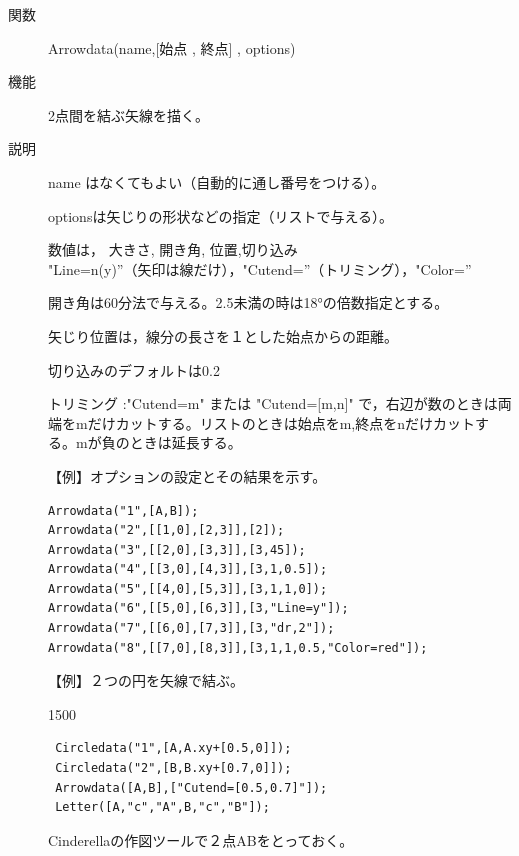 \documentclass[papersize,a4paper,10pt,uplatex]{jsarticle}
\begin{document}
\begin{description}
\vspace{10mm}

\hypertarget{arrowdata}{}
\item[関数]Arrowdata(name,[始点 , 終点] , options) 
\item[機能]2点間を結ぶ矢線を描く。
\item[説明]name はなくてもよい（自動的に通し番号をつける）。

optionsは矢じりの形状などの指定（リストで与える）。

\hspace*{10mm} 数値は， 大きさ, 開き角, 位置,切り込み\\
\hspace*{10mm} "Line=n(y)''（矢印は線だけ），"Cutend=''（トリミング），"Color=''

開き角は60分法で与える。2.5未満の時は18°の倍数指定とする。

矢じり位置は，線分の長さを１とした始点からの距離。

切り込みのデフォルトは0.2
 
トリミング :"Cutend=m" または "Cutend=[m,n]" で，右辺が数のときは両端をmだけカットする。リストのときは始点をm,終点をnだけカットする。mが負のときは延長する。

\vspace{\baselineskip}
【例】オプションの設定とその結果を示す。

\begin{verbatim}
Arrowdata("1",[A,B]);
Arrowdata("2",[[1,0],[2,3]],[2]);
Arrowdata("3",[[2,0],[3,3]],[3,45]);
Arrowdata("4",[[3,0],[4,3]],[3,1,0.5]);
Arrowdata("5",[[4,0],[5,3]],[3,1,1,0]);
Arrowdata("6",[[5,0],[6,3]],[3,"Line=y"]);
Arrowdata("7",[[6,0],[7,3]],[3,"dr,2"]);
Arrowdata("8",[[7,0],[8,3]],[3,1,1,0.5,"Color=red"]);
\end{verbatim}

\vspace{6mm}

\hspace{20mm}\scalebox{0.9}{}

【例】２つの円を矢線で結ぶ。

\begin{layer}{150}{0}
\end{layer}
\hspace{20mm}

\begin{verbatim}
 Circledata("1",[A,A.xy+[0.5,0]]);
 Circledata("2",[B,B.xy+[0.7,0]]);
 Arrowdata([A,B],["Cutend=[0.5,0.7]"]);
 Letter([A,"c","A",B,"c","B"]);
\end{verbatim}
Cinderellaの作図ツールで２点ABをとっておく。


\end{description}
\end{document}
